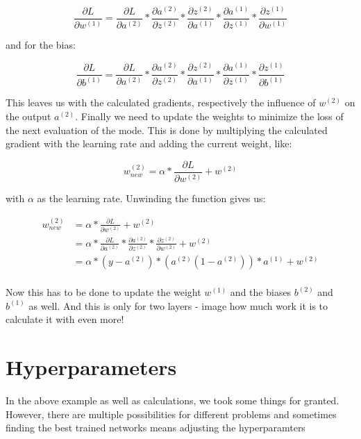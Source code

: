 $$\frac{\partial L}{\partial w^{(1)}} = \frac{\partial L}{\partial a^{(2)}} * \frac{\partial a^{(2)}}{\partial z^{(2)}} * \frac{\partial z^{(2)}}{\partial a^{(1)}} * \frac{\partial a^{(1)}}{\partial z^{(1)}} * \frac{\partial z^{(1)}}{\partial w^{(1)}}$$

and for the bias:

$$\frac{\partial L}{\partial b^{(1)}} = \frac{\partial L}{\partial a^{(2)}} * \frac{\partial a^{(2)}}{\partial z^{(2)}} * \frac{\partial z^{(2)}}{\partial a^{(1)}} * \frac{\partial a^{(1)}}{\partial z^{(1)}} * \frac{\partial z^{(1)}}{\partial b^{(1)}}$$



This leaves us with the calculated gradients, respectively the influence of $w^{(2)}$ on the output $a^{(2)}$. Finally we need to update the weights to minimize the loss of the next evaluation of the mode. This is done by multiplying the calculated gradient with the learning rate and adding the current weight, like:

$$w^{(2)}_{new} = \alpha * \frac{\partial L}{\partial w^{(2)}} + w^{(2)}$$

with $\alpha$ as the learning rate. Unwinding the function gives us:

\begin{align*}
	w^{(2)}_{new}	&= \alpha * \frac{\partial L}{\partial w^{(2)}} + w^{(2)} \\
					&= \alpha * \frac{\partial L}{\partial a^{(2)}} * \frac{\partial a^{(2)}}{\partial z^{(2)}} * \frac{\partial z^{(2)}}{\partial w^{(2)}} + w^{(2)} \\
					&= \alpha * (y - a^{(2)}) * (a^{(2)}(1-a^{(2)})) * a^{(1)} + w^{(2)} \\
\end{align*}

Now this has to be done to update the weight $w^{(1)}$ and the biases $b^{(2)}$ and $b^{(1)}$ as well. And this is only for two layers - image how much work it is to calculate it with even more!
%
%
\section{Hyperparameters}	
%
%
In the above example as well as calculations, we took some things for granted. However, there are multiple possibilities for different problems and sometimes finding the best trained networks means adjusting the hyperparamters
%
%
